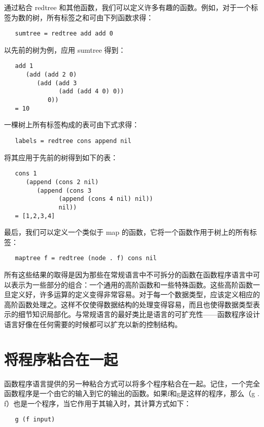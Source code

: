\documentclass[12pt]{article}
\begin{document}
通过粘合 redtree 和其他函数，我们可以定义许多有趣的函数。例如，对于一个标签为数的树，所有标签之和可由下列函数求得：
 
\begin{verbatim}
   sumtree = redtree add add 0
\end{verbatim}

以先前的树为例，应用 sumtree 得到：

\begin{verbatim}
   add 1
      (add (add 2 0)
         (add (add 3 
               (add (add 4 0) 0))
            0))
   = 10
\end{verbatim}

一棵树上所有标签构成的表可由下式求得：

\begin{verbatim}
   labels = redtree cons append nil
\end{verbatim}

将其应用于先前的树得到如下的表：

\begin{verbatim}
   cons 1
      (append (cons 2 nil)
         (append (cons 3
               (append (cons 4 nil) nil))
               nil))
   = [1,2,3,4]
\end{verbatim}

最后，我们可以定义一个类似于 map 的函数，它将一个函数作用于树上的所有标签：

\begin{verbatim}
   maptree f = redtree (node . f) cons nil
\end{verbatim}

所有这些结果的取得是因为那些在常规语言中不可拆分的函数在函数程序语言中可以表示为一些部分的组合：一个通用的高阶函数和一些特殊函数。这些高阶函数一旦定义好，许多运算的定义变得非常容易。对于每一个数据类型，应该定义相应的高阶函数处理之。这样不仅使得数据结构的处理变得容易，而且也使得数据类型表示的细节知识局部化。与常规语言的最好类比是语言的可扩充性——函数程序设计语言好像在任何需要的时候都可以扩充以新的控制结构。

\section{将程序粘合在一起}

函数程序语言提供的另一种粘合方式可以将多个程序粘合在一起。记住，一个完全函数程序是一个由它的输入到它的输出的函数。如果f和g是这样的程序，那么（g . f）也是一个程序，当它作用于其输入时，其计算方式如下：

\begin{verbatim}
   g (f input)
\end{verbatim}
\end{document}
